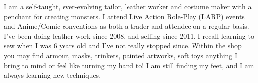 I am a self-taught, ever-evolving tailor, leather worker and costume
maker with a penchant for creating monsters. I attend Live Action
Role-Play (LARP) events and Anime/Comic conventions as both a trader
and attendee on a regular basis. I’ve been doing leather work since
2008, and selling since 2011. I recall learning to sew when I was 6
years old and I’ve not really stopped since. Within the shop you may
find armour, masks, trinkets, painted artworks, soft toys
\textellipsis anything I bring to mind or feel like turning my hand
to! I am still finding my feet, and I am always learning new
techniques.
